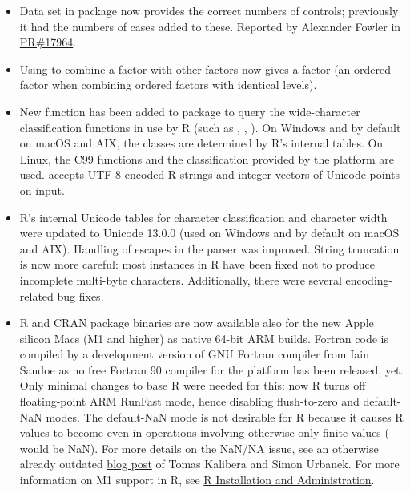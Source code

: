 \begin{itemize}
\item{} Data set  in package  now provides the
correct numbers of controls; previously it had the numbers of cases added to
these.  Reported by Alexander Fowler in \href{https://bugs.R-project.org/bugzilla3/show_bug.cgi?id=17964}{PR\#17964}.

\item{} Using  to combine a factor with other factors now
 gives a factor (an ordered factor when combining ordered factors with
 identical levels).

\item{} New function  has been added to package
 to query the wide-character classification functions in use by R
(such as , , ).  On Windows and
by default on macOS and AIX, the classes are determined by R's internal
tables.  On Linux, the C99 functions and the classification provided by the
platform are used.   accepts UTF-8 encoded R strings and
integer vectors of Unicode points on input.

\item{} R's internal Unicode tables for character classification and
 character width were updated to Unicode 13.0.0 (used on Windows and by
 default on macOS and AIX).  Handling of  escapes in
 the parser was improved.  String truncation is now more careful: most
 instances in R have been fixed not to produce incomplete multi-byte
 characters.  Additionally, there were several encoding-related bug fixes.

\item{} R and CRAN package binaries are now available also for the new Apple
silicon Macs (M1 and higher) as native 64-bit ARM builds.  Fortran code is
compiled by a development version of GNU Fortran compiler from Iain Sandoe
as no free Fortran 90 compiler for the platform has been released, yet. 
Only minimal changes to base R were needed for this: now R turns off
floating-point ARM RunFast mode, hence disabling flush-to-zero and
default-NaN modes.  The default-NaN mode is not desirable for R because it
causes R  values to become  even in operations involving
otherwise only finite values ( would be NaN).  For more details
on the NaN/NA issue, see an otherwise already outdated
\href{https://developer.r-project.org/Blog/public/2020/11/02/will-r-work-on-apple-silicon/}{blog
post} of Tomas Kalibera and Simon Urbanek.  For more information on M1
support in R, see
\href{https://cran.r-project.org/doc/manuals/r-release/R-admin.html}{R
Installation and Administration}.


\end{itemize}
